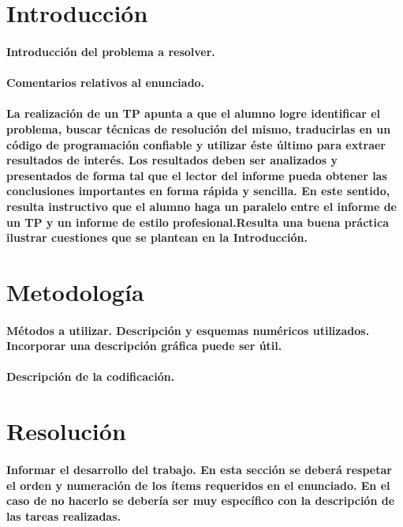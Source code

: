 \documentclass[a4paper,12pt]{article}
\begin{document}

\newpage
\tableofcontents

\newpage
\section{Introducción}
\paragraph{Introducción del problema a resolver.}
\paragraph{Comentarios relativos al enunciado.}
\paragraph{La realización de un TP apunta a que el alumno logre 
identificar el problema, buscar técnicas de resolución del mismo, 
traducirlas en un código de programación confiable y utilizar éste último 
para extraer resultados de interés. Los resultados deben ser analizados 
y presentados de forma tal que el lector del informe pueda obtener las 
conclusiones importantes en forma rápida y sencilla. En este sentido, 
resulta instructivo que  el alumno haga un paralelo entre el informe de 
un TP y un informe de estilo profesional.Resulta una buena práctica 
ilustrar cuestiones que se plantean en la Introducción.}

\section{Metodología}

\paragraph{Métodos a utilizar. Descripción y esquemas numéricos utilizados. Incorporar una descripción gráfica puede ser útil.}
\paragraph{Descripción de la codificación.}

\section{Resolución}

\paragraph{Informar el desarrollo del trabajo. En esta sección se deberá respetar el orden y numeración de los ítems requeridos en el enunciado. En el caso de no hacerlo se debería ser muy específico con la descripción de las tareas realizadas.}
\end{document}

